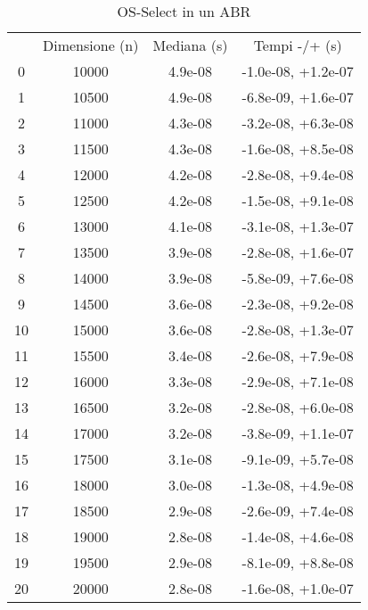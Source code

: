 \begin{table}
\centering
\caption{OS-Select in un ABR}
\label{OS-Select in un ABR}
\begin{adjustbox}{width=1\textwidth/2}
\begin{tabular}{|c|c|c|c|}
\hline
 & Dimensione (n) & Mediana (s) & Tempi -/+ (s) \\
0 & 10000 & 4.9e-08 & -1.0e-08, +1.2e-07 \\
\cline{1-4}
1 & 10500 & 4.9e-08 & -6.8e-09, +1.6e-07 \\
\cline{1-4}
2 & 11000 & 4.3e-08 & -3.2e-08, +6.3e-08 \\
\cline{1-4}
3 & 11500 & 4.3e-08 & -1.6e-08, +8.5e-08 \\
\cline{1-4}
4 & 12000 & 4.2e-08 & -2.8e-08, +9.4e-08 \\
\cline{1-4}
5 & 12500 & 4.2e-08 & -1.5e-08, +9.1e-08 \\
\cline{1-4}
6 & 13000 & 4.1e-08 & -3.1e-08, +1.3e-07 \\
\cline{1-4}
7 & 13500 & 3.9e-08 & -2.8e-08, +1.6e-07 \\
\cline{1-4}
8 & 14000 & 3.9e-08 & -5.8e-09, +7.6e-08 \\
\cline{1-4}
9 & 14500 & 3.6e-08 & -2.3e-08, +9.2e-08 \\
\cline{1-4}
10 & 15000 & 3.6e-08 & -2.8e-08, +1.3e-07 \\
\cline{1-4}
11 & 15500 & 3.4e-08 & -2.6e-08, +7.9e-08 \\
\cline{1-4}
12 & 16000 & 3.3e-08 & -2.9e-08, +7.1e-08 \\
\cline{1-4}
13 & 16500 & 3.2e-08 & -2.8e-08, +6.0e-08 \\
\cline{1-4}
14 & 17000 & 3.2e-08 & -3.8e-09, +1.1e-07 \\
\cline{1-4}
15 & 17500 & 3.1e-08 & -9.1e-09, +5.7e-08 \\
\cline{1-4}
16 & 18000 & 3.0e-08 & -1.3e-08, +4.9e-08 \\
\cline{1-4}
17 & 18500 & 2.9e-08 & -2.6e-09, +7.4e-08 \\
\cline{1-4}
18 & 19000 & 2.8e-08 & -1.4e-08, +4.6e-08 \\
\cline{1-4}
19 & 19500 & 2.9e-08 & -8.1e-09, +8.8e-08 \\
\cline{1-4}
20 & 20000 & 2.8e-08 & -1.6e-08, +1.0e-07 \\
\cline{1-4}
\end{tabular}
\end{adjustbox}
\end{table}

